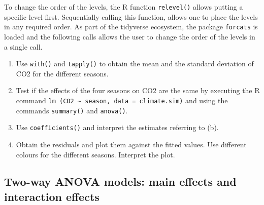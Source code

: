 \documentclass[
]{book}
\newenvironment{Shaded}{\begin{snugshade}}{\end{snugshade}}
\newcommand{\CommentTok}[1]{\textcolor[rgb]{0.56,0.35,0.01}{\textit{#1}}}
\newcommand{\FunctionTok}[1]{\textcolor[rgb]{0.13,0.29,0.53}{\textbf{#1}}}
\newcommand{\NormalTok}[1]{#1}
\newcommand{\OtherTok}[1]{\textcolor[rgb]{0.56,0.35,0.01}{#1}}
\newcommand{\SpecialCharTok}[1]{\textcolor[rgb]{0.81,0.36,0.00}{\textbf{#1}}}
\newcommand{\StringTok}[1]{\textcolor[rgb]{0.31,0.60,0.02}{#1}}
\begin{document}
To change the order of the levels, the R function \texttt{relevel()} allows putting a specific level first. Sequentially calling this function, allows one to place the levels in any required order. As part of the tidyverse ecosystem, the package \texttt{forcats} is loaded and the following calls allows the user to change the order of the levels in a single call.

\begin{Shaded}
\end{Shaded}

\begin{enumerate}
\def\labelenumi{(\alph{enumi})}
\setcounter{enumi}{1}
\item
  Use \texttt{with()} and \texttt{tapply()} to obtain the mean and the standard deviation of CO2 for the different seasons.
\item
  Test if the effects of the four seasons on CO2 are the same by executing the R command \texttt{lm\ (CO2\ \textasciitilde{}\ season,\ data\ =\ climate.sim)} and using the commands \texttt{summary()} and \texttt{anova()}.
\item
  Use \texttt{coefficients()} and interpret the estimates referring to (b).
\item
  Obtain the residuals and plot them against the fitted values. Use different colours for the different seasons. Interpret the plot.
\end{enumerate}

\subsection{Two-way ANOVA models: main effects and interaction effects}\label{two-way-anova-models-main-effects-and-interaction-effects}
\end{document}
